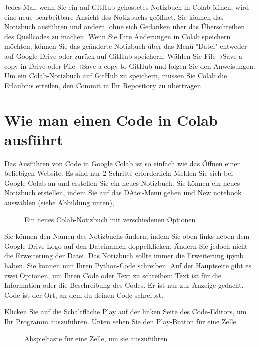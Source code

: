 Jedes Mal, wenn Sie ein auf GitHub gehostetes Notizbuch in Colab öffnen, wird eine neue bearbeitbare Ansicht des Notizbuchs geöffnet. Sie können das Notizbuch ausführen und ändern, ohne sich Gedanken über das Überschreiben des Quellcodes zu machen.
Wenn Sie Ihre Änderungen in Colab speichern möchten, können Sie das geänderte Notizbuch über das Menü "Datei" entweder auf Google Drive oder zurück auf GitHub speichern. Wählen Sie File→Save a copy in Drive oder File→Save a copy to GitHub und folgen Sie den Anweisungen. Um ein Colab-Notizbuch auf GitHub zu speichern, müssen Sie Colab die Erlaubnis erteilen, den Commit in Ihr Repository zu übertragen.

\section{Wie man einen Code in Colab ausführt}

Das Ausführen von Code in Google Colab ist so einfach wie das Öffnen einer beliebigen Website. Es sind nur 2 Schritte erforderlich: Melden Sie sich bei Google Colab an und erstellen Sie ein neues Notizbuch.
Sie können ein neues Notizbuch erstellen, indem Sie auf das DAtei-Menü  gehen und \glqq New notebook\grqq{} auswählen (siehe Abbildung unten), 

\begin{figure}[H]
	\centering
	\caption{Ein neues Colab-Notizbuch mit verschiedenen Optionen}
\end{figure}

Sie können den Namen des Notizbuchs ändern, indem Sie oben links neben dem Google Drive-Logo auf den Dateinamen doppelklicken. Ändern Sie jedoch nicht die Erweiterung der Datei. Das Notizbuch sollte immer die Erweiterung \glqq ipynb\grqq{} haben. Sie können nun Ihren Python-Code schreiben. Auf der Hauptseite gibt es zwei Optionen, um Ihren Code oder Text zu schreiben: Text ist für die Information oder die Beschreibung des Codes. Er ist nur zur Anzeige gedacht. Code ist der Ort, an dem du deinen Code schreibst.

Klicken Sie auf die Schaltfläche \glqq Play\grqq{} auf der linken Seite des Code-Editors, um Ihr Programm auszuführen. Unten sehen Sie den Play-Button für eine Zelle. 

\begin{figure}[H]
	\centering
	\caption{Abspieltaste für eine Zelle, um sie auszuführen}
\end{figure}

